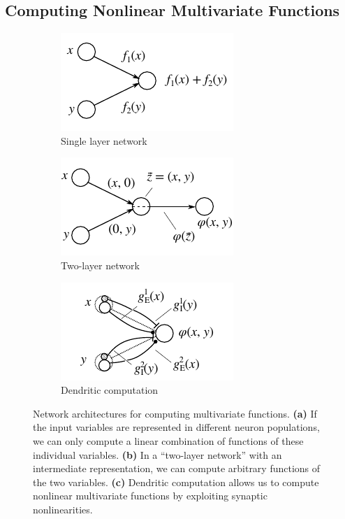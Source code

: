 \documentclass[10pt,letterpaper,oneside]{article}
\begin{document}
\subsection{Computing Nonlinear Multivariate Functions}

\begin{figure}
	\begin{subfigure}{0.33\textwidth}%
		\centering%
		\includegraphics{media/network_a.pdf}%
		\caption{Single layer network}%
		\label{fig:network_a}%
	\end{subfigure}%
	\begin{subfigure}{0.33\textwidth}%
		\centering%
		\includegraphics{media/network_c.pdf}%
		\caption{Two-layer network}%
		\label{fig:network_c}%
	\end{subfigure}%
	\begin{subfigure}{0.33\textwidth}%
		\centering%
		\includegraphics{media/network_d.pdf}%
		\caption{Dendritic computation}%
		\label{fig:network_d}%
	\end{subfigure}%
	\caption{Network architectures for computing multivariate functions. \textbf{(a)} If the input variables are represented in different neuron populations, we can only compute a linear combination of functions of these individual variables. \textbf{(b)} In a \enquote{two-layer network} with an intermediate representation, we can compute arbitrary functions of the two variables. \textbf{(c)} Dendritic computation allows us to compute nonlinear multivariate functions by exploiting synaptic nonlinearities.}
	\label{fig:networks}
\end{figure}
\end{document}
